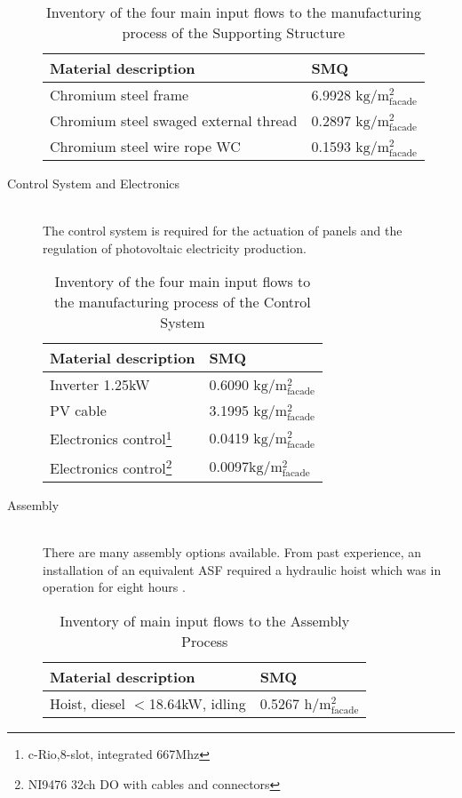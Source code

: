 \begin{description}
\begin{table}[H]
\centering
\begin{tabular}{ll}
\hline
Material description & SMQ \\ \hline
Chromium steel frame & 6.9928 ${\mathrm{kg/m^2_{facade}}}$ \\
Chromium steel swaged external thread  &0.2897 ${\mathrm{kg/m^2_{facade}}}$\\
Chromium steel wire rope WC  & 0.1593 ${\mathrm{kg/m^2_{facade}}}$\\
\hline
\end{tabular}
\caption{Inventory of the four main input flows to the manufacturing process of the Supporting Structure}
\label{tab:StructureInv}
\end{table}

\item[Control System and Electronics] \hfill \\
The control system is required for the actuation of panels and the regulation of photovoltaic electricity production.\\

\begin{table}[H]
\centering
\begin{tabular}{ll}
\hline
Material description & SMQ \\ \hline
Inverter 1.25kW	 & 0.6090 ${\mathrm{kg/m^2_{facade}}}$ \\
PV cable  & 3.1995 ${\mathrm{kg/m^2_{facade}}}$\\
Electronics control\footnote{c-Rio,8-slot, integrated 667Mhz}& 0.0419 ${\mathrm{kg/m^2_{facade}}}$\\
Electronics control\footnote{NI9476 32ch DO with cables and connectors}& 0.0097${\mathrm{kg/m^2_{facade}}}$\\
\hline
\end{tabular}
\caption{Inventory of the four main input flows to the manufacturing process of the Control System}
\label{tab:ControlInv}
\end{table}

\item[Assembly] \hfill \\
There are many assembly options available. From past experience, an installation of an equivalent ASF required a hydraulic hoist which was in operation for eight hours \cite{jayathissa2015abs}. \\

\begin{table}[H]
\centering
\begin{tabular}{ll}
\hline
Material description & SMQ \\ \hline
Hoist, diesel  ${<}$18.64kW, idling & 0.5267 ${\mathrm{h/m^2_{facade}}}$ \\
\hline
\end{tabular}
\caption{Inventory of main input flows to the Assembly Process}
\label{tab:AssemblyInv}
\end{table}

\end{description}

